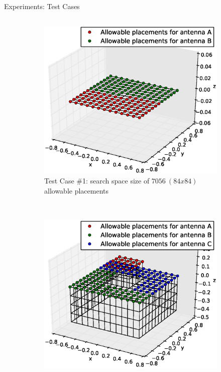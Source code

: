 \documentclass{beamer}
\begin{document}
\begin{frame}{Experiments: Test Cases}
    \begin{columns}
        \begin{column}{.5\columnwidth}
            \begin{figure}
        \vspace*{-0.5cm}
                \centering
                \begin{subfigure}{\columnwidth}
                    \includegraphics[trim=0 30 0 50, clip,scale=0.25]{../paper/FIG/tc1_figure}%
                    \caption*{\tiny Test Case \#1: search space size of $7056~(84x84)$ allowable placements}%
                \end{subfigure}\hfill\\
                \begin{subfigure}{\columnwidth}
                    \includegraphics[trim=0 30 0 50, clip, scale=0.25]{../paper/FIG/tc3_figure}%

\end{subfigure}
\end{figure}
\end{column}
\end{columns}
\end{frame}
\end{document}
